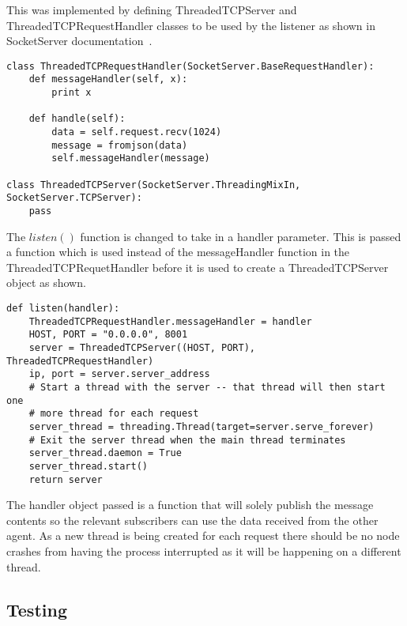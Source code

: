 This was implemented by defining ThreadedTCPServer and ThreadedTCPRequestHandler
classes to be used by the listener as shown in SocketServer documentation~\cite{socketServerDocs}.
\begin{lstlisting}
class ThreadedTCPRequestHandler(SocketServer.BaseRequestHandler):
    def messageHandler(self, x):
        print x

    def handle(self):
        data = self.request.recv(1024)
        message = fromjson(data)
        self.messageHandler(message)

class ThreadedTCPServer(SocketServer.ThreadingMixIn, SocketServer.TCPServer):
    pass
\end{lstlisting}
The $listen()$ function is changed to take in a handler parameter. This is
passed a function which is used instead of the messageHandler function in
the ThreadedTCPRequetHandler before it is used to create a ThreadedTCPServer
object as shown.
\begin{lstlisting}
def listen(handler):
    ThreadedTCPRequestHandler.messageHandler = handler
    HOST, PORT = "0.0.0.0", 8001
    server = ThreadedTCPServer((HOST, PORT), ThreadedTCPRequestHandler)
    ip, port = server.server_address
    # Start a thread with the server -- that thread will then start one
    # more thread for each request
    server_thread = threading.Thread(target=server.serve_forever)
    # Exit the server thread when the main thread terminates
    server_thread.daemon = True
    server_thread.start()
    return server
\end{lstlisting}
The handler object passed is a function that will solely publish the
message contents so the relevant subscribers can use the data received
from the other agent. As a new thread is being created for each request
there should be no node crashes from having the process interrupted as
it will be happening on a different thread.

\subsection{Testing}\label{soft/comms/test}

